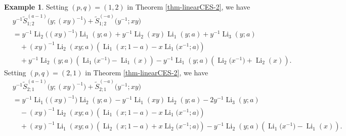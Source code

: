 \documentclass[11pt]{article}
\DeclareMathOperator{\Li}{Li}
\theoremstyle{plain}
\theoremstyle{definition}
\newtheorem{exa}[thm]{Example}
\begin{document}
\begin{exa}Setting $(p,q)=(1,2)$ in Theorem \ref{thm-linearCES-2}, we have
\begin{align*}
	&y^{-1}\tilde{S}^{(a-1)}_{1;2}\Big(y;(xy)^{-1}\Big)+\tilde{S}^{(-a)}_{1;2}\Big(y^{-1};xy\Big)\nonumber\\
	&=y^{-1}\Li_2\Big((xy)^{-1}\Big)\Li_1(y;a)+y^{-1}\Li_{2}(xy)\Li_1(y;a)+y^{-1}\Li_{3}(y;a)\nonumber\\
	&\quad+(xy)^{-1}\Li_{2}(xy;a)\left(\Li_{1}(x;1-a)-x\Li_{1}\Big(x^{-1};a\Big)\right)\nonumber\\
	&\quad+y^{-1}\Li_{2}(y;a)\left(\Li_{1}\Big(x^{-1}\Big)-\Li_{1}(x)\right)-y^{-1}\Li_{1}(y;a)\left(\Li_{2}\Big(x^{-1}\Big)+\Li_{2}(x)\right).
\end{align*}
Setting $(p,q)=(2,1)$ in Theorem \ref{thm-linearCES-2}, we have
\begin{align*}
	&y^{-1}\tilde{S}^{(a-1)}_{2;1}\Big(y;(xy)^{-1}\Big)+\tilde{S}^{(-a)}_{2;1}\Big(y^{-1};xy\Big)\nonumber\\
	&=y^{-1}\Li_1\Big((xy)^{-1}\Big)\Li_2(y;a)-y^{-1}\Li_{1}(xy)\Li_2(y;a)-2y^{-1}\Li_{3}(y;a)\nonumber\\
	&\quad-(xy)^{-1}\Li_{2}(xy;a)\left(\Li_{1}(x;1-a)-x \Li_{1}\Big(x^{-1};a\Big)\right)\\
	&\quad+(xy)^{-1}\Li_{1}(xy;a)\left(\Li_{2}(x;1-a)+x\Li_{2}\Big(x^{-1};a\Big)\right)-y^{-1}\Li_{2}(y;a)\left(\Li_{1}\Big(x^{-1}\Big)-\Li_{1}(x)\right).
\end{align*}
\end{exa}
\end{document}
